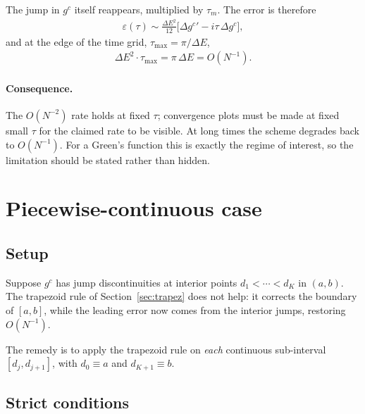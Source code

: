 \documentclass{article}
\begin{document}
	The jump in $g^c$ itself reappears, multiplied by $\tau_m$. The error is
	therefore
	\begin{align}
		\varepsilon(\tau) \sim \frac{\Delta E^2}{12}
		\Big[\Delta{g^c}' - i\tau\,\Delta g^c\Big],
	\end{align}
	and at the edge of the time grid, $\tau_{\max} = \pi/\Delta E$,
	\begin{align}
		\Delta E^2 \cdot \tau_{\max} = \pi\,\Delta E = O(N^{-1}).
	\end{align}
	
	\paragraph{Consequence.} The $O(N^{-2})$ rate holds at fixed $\tau$; convergence
	plots must be made at fixed small $\tau$ for the claimed rate to be visible. At
	long times the scheme degrades back to $O(N^{-1})$. For a Green's function this
	is exactly the regime of interest, so the limitation should be stated rather
	than hidden.
	
	\section{Piecewise-continuous case}
	
	\subsection{Setup}
	
	Suppose $g^c$ has jump discontinuities at interior points
	$d_1 < \cdots < d_K$ in $(a,b)$. The trapezoid rule of Section~\ref{sec:trapez}
	does not help: it corrects the boundary of $[a,b]$, while the leading error now
	comes from the interior jumps, restoring $O(N^{-1})$.
	
	The remedy is to apply the trapezoid rule on \emph{each} continuous sub-interval
	$[d_j, d_{j+1}]$, with $d_0 \equiv a$ and $d_{K+1} \equiv b$.
	
	\subsection{Strict conditions}
	
\end{document}
